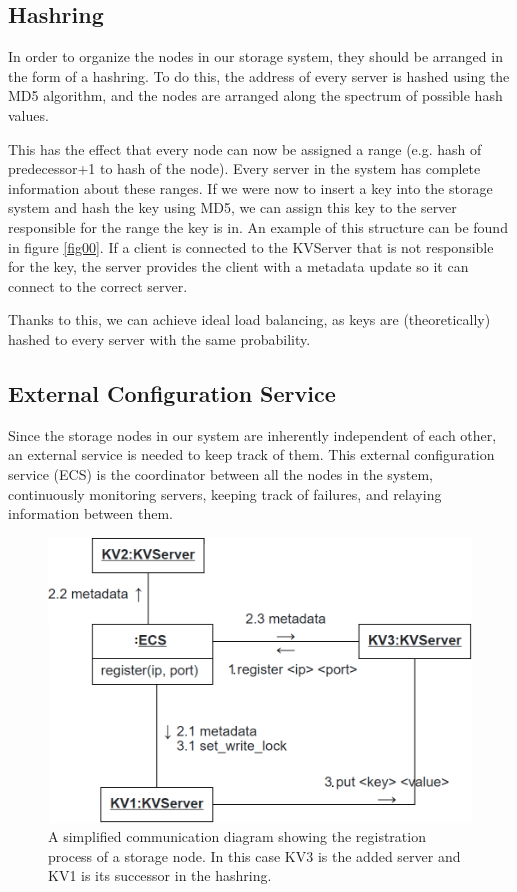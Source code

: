 \documentclass[sigconf]{acmart}
\begin{document}
\subsection{Hashring}
In order to organize the nodes in our storage system, they should be arranged in the form of a hashring.
To do this, the address of every server is hashed using the MD5 algorithm, and the nodes are arranged along the spectrum of possible hash values.

This has the effect that every node can now be assigned a range (e.g. hash of predecessor+1 to hash of the node). Every server in the system has complete information about these ranges. If we were now to insert a key into the storage system and hash the key using MD5, we can assign this key to the server responsible for the range the key is in. An example of this structure can be found in figure \ref{fig00}. If a client is connected to the KVServer that is not responsible for the key, the server provides the client with a metadata update so it can connect to the correct server.

Thanks to this, we can achieve ideal load balancing, as keys are (theoretically) hashed to every server with the same probability.

\subsection{External Configuration Service}
Since the storage nodes in our system are inherently independent of each other, an external service is needed to keep track of them. This external configuration service (ECS) is the coordinator between all the nodes in the system, continuously monitoring servers, keeping track of failures, and relaying information between them.

\begin{center}
  \begin{figure}[htbp]
    \centerline{\includegraphics[scale=0.3]{attachments/registration.png}}
    \caption{A simplified communication diagram showing the registration process of a storage node. In this case KV3 is the added server and KV1 is its successor in the hashring.}
    \label{fig01}
  \end{figure}
\end{center}
\end{document}
